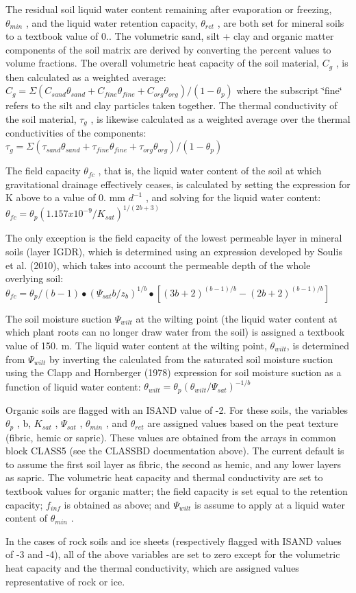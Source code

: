 The residual soil liquid water content remaining after evaporation or freezing, $\theta_{min}$ , and the liquid water retention capacity, $\theta_{ret}$ , are both set for mineral soils to a textbook value of 0.. The volumetric sand, silt + clay and organic matter components of the soil matrix are derived by converting the percent values to volume fractions. The overall volumetric heat capacity of the soil material, $C_g$ , is then calculated as a weighted average\+: $C_g = \Sigma (C_{sand} \theta_{sand} + C_{fine} \theta_{fine} + C_{org} \theta_{org} )/(1 - \theta_p )$ where the subscript \char`\"{}fine\char`\"{} refers to the silt and clay particles taken together. The thermal conductivity of the soil material, $\tau_g$ , is likewise calculated as a weighted average over the thermal conductivities of the components\+: $\tau_g = \Sigma (\tau_{sand} \theta_{sand} + \tau_{fine} \theta_{fine} + \tau_{org} \theta_{org} )/(1 - \theta_p )$

The field capacity $\theta_{fc}$ , that is, the liquid water content of the soil at which gravitational drainage effectively ceases, is calculated by setting the expression for K above to a value of 0. mm $d^{-1}$ , and solving for the liquid water content\+: $\theta_{fc} = \theta_p (1.157 x 10^{-9} /K_{sat} )^{1/(2b + 3)}$

The only exception is the field capacity of the lowest permeable layer in mineral soils (layer I\+G\+D\+R), which is determined using an expression developed by Soulis et al. (2010), which takes into account the permeable depth of the whole overlying soil\+: $\theta_{fc} = \theta_p /(b-1) \bullet (\Psi_{sat} b/ z_b )^{1/b} \bullet [(3b+2)^{(b-1)/b} - (2b+2)^{(b-1)/b} ]$

The soil moisture suction $\Psi_{wilt}$ at the wilting point (the liquid water content at which plant roots can no longer draw water from the soil) is assigned a textbook value of 150. m. The liquid water content at the wilting point, $ \theta_{wilt} $, is determined from $\Psi_{wilt}$ by inverting the calculated from the saturated soil moisture suction using the Clapp and Hornberger (1978) \cite{Clapp1978-898} expression for soil moisture suction as a function of liquid water content\+: $ \theta_{wilt} = \theta_p (\theta_{wilt} / \Psi_{sat} )^{-1/b} $

Organic soils are flagged with an I\+S\+A\+N\+D value of -\/2. For these soils, the variables $\theta_p$ , b, $K_{sat}$ , $\Psi_{sat}$ , $\theta_{min}$ , and $\theta_{ret}$ are assigned values based on the peat texture (fibric, hemic or sapric). These values are obtained from the arrays in common block C\+L\+A\+S\+S5 (see the C\+L\+A\+S\+S\+B\+D documentation above). The current default is to assume the first soil layer as fibric, the second as hemic, and any lower layers as sapric. The volumetric heat capacity and thermal conductivity are set to textbook values for organic matter; the field capacity is set equal to the retention capacity; $f_{inf}$ is obtained as above; and $\Psi_{wilt}$ is assume to apply at a liquid water content of $\theta_{min}$ .

In the cases of rock soils and ice sheets (respectively flagged with I\+S\+A\+N\+D values of -\/3 and -\/4), all of the above variables are set to zero except for the volumetric heat capacity and the thermal conductivity, which are assigned values representative of rock or ice.